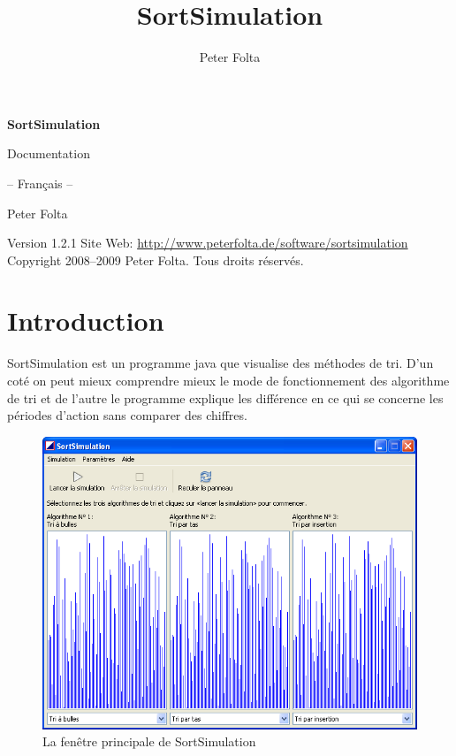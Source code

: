 \documentclass[11pt, a4paper, titlepage, twoside]{article}
\title{SortSimulation}
\author{Peter Folta}
\newcommand{\version}{1.2.1}
\begin{document}
	
	\begin{titlepage}
		\begin{center}
			\vspace*{2.5cm}
			\Huge{\textbf{SortSimulation}}
			
			\vspace*{1.5cm}
			\LARGE{Documentation}
			
			\Large{-- Français --}
			
			\vspace*{3.75cm}
			\Large{Peter Folta}
		\end{center}
		
		\vspace*{8cm}
		\noindent{}Version \version\newline{}
		Site Web: \href{http://www.peterfolta.de/software/sortsimulation}{http://www.peterfolta.de/software/sortsimulation}\newline{}
		Copyright \textcopyright{} 2008--2009 Peter Folta. Tous droits réservés.
	\end{titlepage}
	
	\setcounter{page}{2}
	
	\cleardoublepage{}
	\tableofcontents{}
	\newpage{}
	
	
	\section{Introduction}
	
	SortSimulation est un programme java que visualise des méthodes de tri. D’un coté on peut mieux comprendre mieux le mode de fonctionnement des algorithme de tri et de l’autre le programme explique les différence en ce qui se concerne les périodes d'action sans comparer des chiffres.
	
	\begin{figure}[h]
		\begin{center}
			\includegraphics[scale=0.6]{images/image0.png}
			\caption{La fenêtre principale de SortSimulation}
		\end{center}
	\end{figure}
	
\end{document}

